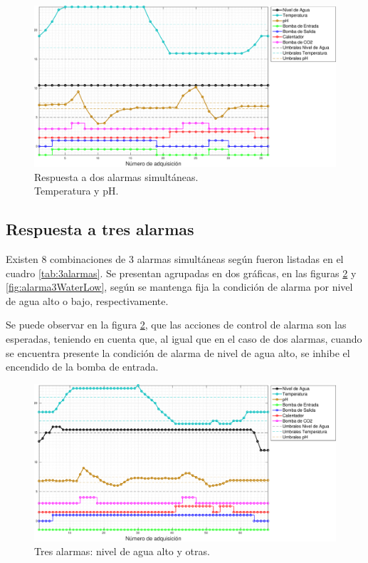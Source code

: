\vspace{20px}

\begin{figure}[htpb!]
\centering
    \includegraphics[width=\textwidth]{./Figures/plot2Temp.pdf}
	\caption{Respuesta a dos alarmas simultáneas.\\ Temperatura y pH.}
	\label{fig:alarma2Temp}
\end{figure}

\clearpage
\subsection{Respuesta a tres alarmas}
\label{sec:3alarma}

Existen 8 combinaciones de 3 alarmas simultáneas según fueron listadas en el cuadro \ref{tab:3alarmas}. Se presentan agrupadas en dos gráficas, en las figuras \ref{fig:alarma3WaterHigh} y \ref{fig:alarma3WaterLow}, según se mantenga fija la condición de alarma por nivel de agua alto o bajo, respectivamente.

Se puede observar en la figura \ref{fig:alarma3WaterHigh}, que las acciones de control de alarma son las esperadas, teniendo en cuenta que, al igual que en el caso de dos alarmas, cuando se encuentra presente la condición de alarma de nivel de agua alto, se inhibe el encendido de la bomba de entrada.

\begin{figure}[hp]
\centering
    \includegraphics[width=\textwidth]{./Figures/plot3waterHigh.pdf}
	\caption[Respuesta a tres alarmas simultáneas. Nivel de agua alto y otras.]{Tres alarmas: nivel de agua alto y otras.}
	\label{fig:alarma3WaterHigh}
\end{figure}

